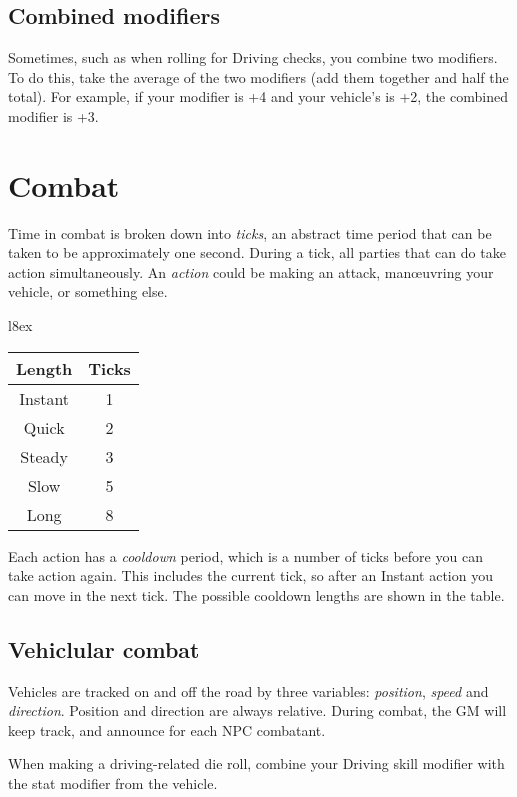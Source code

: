 \documentclass[10pt, a4paper, twocolumn]{article}
\begin{document}
\subsection{Combined modifiers}
Sometimes, such as when rolling for Driving checks, you combine two
modifiers. To do this, take the average of the two modifiers (add them
together and half the total). For example, if your 
modifier is +4 and your vehicle's  is +2, the combined modifier
is +3.

\section{Combat}
Time in combat is broken down into \emph{ticks}, an abstract time period that
can be taken to be approximately one second. During a tick, all parties that
can do take action simultaneously. An \emph{action} could be making an attack,
man\oe{}uvring your vehicle, or something else.

\begin{wraptable}[5]{l}{8ex}
  \small
\vspace*{-4ex}
\hspace*{-4ex}
\begin{tabular}{cc}
  Length   & Ticks \\
  \hline 
  Instant  & 1     \\
  Quick    & 2     \\
  Steady   & 3     \\
  Slow     & 5     \\
  Long     & 8
\end{tabular}
\end{wraptable}

Each action has a \emph{cooldown} period, which is a number of ticks before you
can take action again. This includes the current tick, so after an Instant
action you can move in the next tick. The possible cooldown lengths are shown in
the table. 

\subsection{Vehiclular combat}
Vehicles are tracked on and off the road by three variables: \emph{position},
\emph{speed} and \emph{direction}. Position and direction are always relative.
During combat, the GM will keep track, and announce for each NPC combatant.

When making a driving-related die roll, combine your Driving skill modifier with
the stat modifier from the vehicle.
\end{document}
